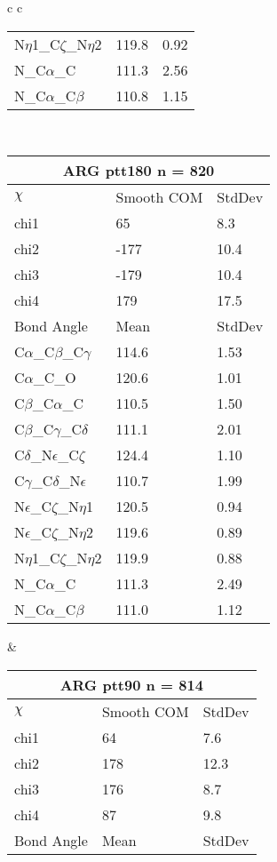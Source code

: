 \begin{longtable}{ c c }
\begin{tabular}{ l l l }
  N$\eta$1\_C$\zeta$\_N$\eta$2 & 119.8 & 0.92\\
  N\_C$\alpha$\_C & 111.3 & 2.56\\
  N\_C$\alpha$\_C$\beta$ & 110.8 & 1.15\\
  \bottomrule
  \end{tabular}
  \\
  \begin{tabular}{ l l l }
  \toprule
  \multicolumn{3}{c}{ARG \textbf{ptt180} n = 820} \\ \toprule
  $\chi$       & Smooth COM & StdDev \\ \midrule
  chi1 & 65 & 8.3 \\ 
  chi2 & -177 & 10.4 \\ 
  chi3 & -179 & 10.4 \\ 
  chi4 & 179 & 17.5 \\ \midrule
  Bond Angle   & Mean     & StdDev \\ \midrule
  C$\alpha$\_C$\beta$\_C$\gamma$ & 114.6 & 1.53\\
  C$\alpha$\_C\_O & 120.6 & 1.01\\
  C$\beta$\_C$\alpha$\_C & 110.5 & 1.50\\
  C$\beta$\_C$\gamma$\_C$\delta$ & 111.1 & 2.01\\
  C$\delta$\_N$\epsilon$\_C$\zeta$ & 124.4 & 1.10\\
  C$\gamma$\_C$\delta$\_N$\epsilon$ & 110.7 & 1.99\\
  N$\epsilon$\_C$\zeta$\_N$\eta$1 & 120.5 & 0.94\\
  N$\epsilon$\_C$\zeta$\_N$\eta$2 & 119.6 & 0.89\\
  N$\eta$1\_C$\zeta$\_N$\eta$2 & 119.9 & 0.88\\
  N\_C$\alpha$\_C & 111.3 & 2.49\\
  N\_C$\alpha$\_C$\beta$ & 111.0 & 1.12\\
  \bottomrule
  \end{tabular}
  &
  \begin{tabular}{ l l l }
  \toprule
  \multicolumn{3}{c}{ARG \textbf{ptt90} n = 814} \\ \toprule
  $\chi$       & Smooth COM & StdDev \\ \midrule
  chi1 & 64 & 7.6 \\ 
  chi2 & 178 & 12.3 \\ 
  chi3 & 176 & 8.7 \\ 
  chi4 & 87 & 9.8 \\ \midrule
  Bond Angle   & Mean     & StdDev \\ \midrule

\end{tabular}
\end{longtable}
